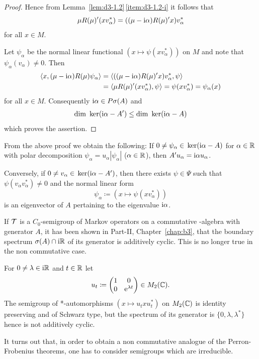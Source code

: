 \begin{proof}
Hence from Lemma~\ref{lem:d3-1.2}\,\ref{item:d3-1.2-i} it follows that
\[
\mu R(\mu)'(xv_{\alpha}^{*}) = ((\mu - \mathrm{i}\alpha)R(\mu)'x)v_{\alpha}^{*}
\]
for all $x \in M$.

Let $\psi_{\alpha}$ be the normal linear functional $(x \mapsto \psi(xv_{\alpha}^{*}))$ on $M$ and note that \mbox{$\psi_{\alpha}(v_{\alpha}) \neq 0$}.
Then
\begin{align*}
\langle x, (\mu - \mathrm{i}\alpha)R(\mu)\psi_{\alpha} \rangle &= \langle ((\mu - \mathrm{i}\alpha)R(\mu)'x)v_{\alpha}^{*},\psi \rangle \\
&= \langle \mu R(\mu)'(xv_{\alpha}^{*}),\psi \rangle = \psi(xv_{\alpha}^{*}) = \psi_{\alpha}(x)
\end{align*}
for all $x \in M$.
Consequently $\mathrm{i}\alpha \in P\sigma(A)$ and
\[
\dim \Kern{\im\alpha - A'} \leq \dim \Kern{\im\alpha - A}
\]
which proves the assertion.
\end{proof}

\begin{remark}\label{rem:d3-1.9}
From the above proof we obtain the following: If 
\mbox{$0 \neq \psi_{\alpha} \in \mathop{}\mathrm{ker}(\mathrm{i}\alpha - A)$} for $ \alpha \in \mathbb{R} $ with polar decomposition 
$\psi_{\alpha} = u_{\alpha}|\psi_{\alpha}|$ ($\alpha \in \mathbb{R}$), 
then $A'u_{\alpha} = \mathrm{i}\alpha u_{\alpha}$.

Conversely, if\/ $0 \neq v_{\alpha} \in \mathop{}\mathrm{ker}(\mathrm{i}\alpha - A')$, then there exists $\psi \in \Psi$ such that 
\mbox{$\psi(v_{\alpha}v_{\alpha}^{*}) \neq 0$} and the normal linear form
\[
\psi_{\alpha} \coloneq (x \mapsto \psi(xv_{\alpha}^{*}))
\]
is an eigenvector of\/ $A$ pertaining to the eigenvalue $\mathrm{i}\alpha$.
\end{remark}
If\/ $\mathcal{T}$ is a $C_{0}$-semigroup of Markov operators on a commutative \CA-algebra with generator $A$, it has been shown in Part-II, Chapter~\ref{chap:b3},  that the boundary spectrum $\sigma(A) \cap \mathrm{i}\mathbb{R}$ of its generator is additively cyclic.
This is no longer true in the non commutative case.
\begin{example*}\label{ex:d3-1.10}
For $0 \neq \lambda \in \mathrm{i}\mathbb{R}$ and $t \in \mathbb{R}$ let
\[
u_{t} \coloneq \begin{pmatrix} 1 & 0 \\ 
0 & \mathrm{e}^{\lambda t} \end{pmatrix} 
\in M_{2}(\mathbb{C}) .
\]
The semigroup of *-automorphisms $(x \mapsto u_{t}xu_{t}^{*})$ on $M_{2}(\mathbb{C})$ is identity preserving and of Schwarz type, but the spectrum of its generator is $\{0, \lambda, \lambda^{*}\}$ hence is not additively cyclic.
\end{example*}
It turns out that, in order to obtain a non commutative analogue of the Perron-Frobenius theorems, one has to consider semigroups which are irreducible.

